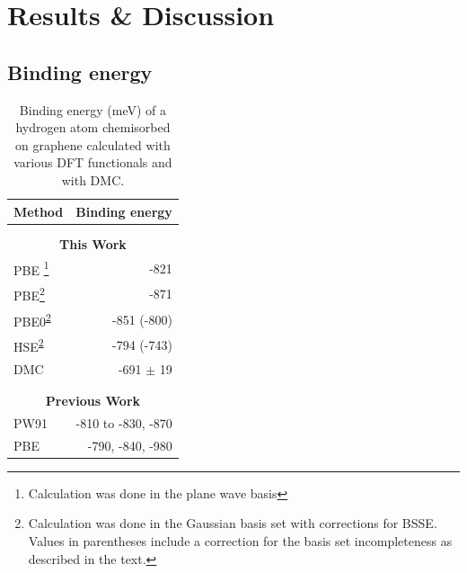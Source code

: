 
\section{Results \& Discussion}

\subsection{Binding energy}
 \begin{table}[ht]
     \caption{Binding energy (meV) of a hydrogen atom chemisorbed on graphene calculated with various DFT functionals and with DMC.}
    \centering
    \begin{tabular}{lr}%
    Method & Binding energy\\\hline \\\\[-2em]%
    \multicolumn{2}{c}{\bfseries This Work} \\
    PBE \footnote{\label{pw}Calculation was done in the plane wave basis} & -821\\ %
    PBE\footnote{\label{gbs}Calculation was done in the Gaussian basis set with corrections for BSSE. Values in parentheses include a correction for the basis set incompleteness as described in the text.} & -871\\ 
    PBE0\textsuperscript{\ref{gbs}}& -851 (-800)\\ 
    HSE\textsuperscript{\ref{gbs}}& -794 (-743)\\ 
    DMC  & -691 $\pm$ 19 \\ \hline \\\\[-2em]%
    \multicolumn{2}{c}{\bfseries Previous Work}\\
    PW91  &  -810 to -830\cite{doi:10.1063/1.3187941}, -870\cite{10.1103/PhysRevLett.93.187202}\\
    PBE  & -790\cite{10.1103/PhysRevB.78.041402}, -840\cite{doi:10.1063/1.3072333}, -980\cite{10.1088/0957-4484/19/15/155708}\\
     \hline%
    \end{tabular}
\label{tab:summary_energetics}
 \end{table}
 

